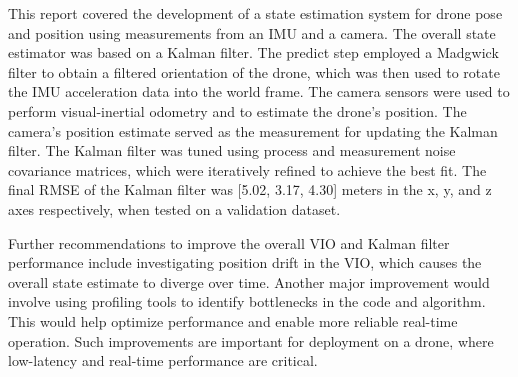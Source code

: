 \documentclass[bare_jrnl_transmag]{subfiles}
\begin{document}
This report covered the development of a state estimation system for drone pose and position using measurements from an IMU and a camera. The overall state estimator was based on a Kalman filter. The predict step employed a Madgwick filter to obtain a filtered orientation of the drone, which was then used to rotate the IMU acceleration data into the world frame. The camera sensors were used to perform visual-inertial odometry and to estimate the drone's position. The camera's position estimate served as the measurement for updating the Kalman filter. The Kalman filter was tuned using process and measurement noise covariance matrices, which were iteratively refined to achieve the best fit. The final RMSE of the Kalman filter was [5.02, 3.17, 4.30] meters in the x, y, and z axes respectively, when tested on a validation dataset. \newline

Further recommendations to improve the overall VIO and Kalman filter performance include investigating position drift in the VIO, which causes the overall state estimate to diverge over time. Another major improvement would involve using profiling tools to identify bottlenecks in the code and algorithm. This would help optimize performance and enable more reliable real-time operation. Such improvements are important for deployment on a drone, where low-latency and real-time performance are critical.
\end{document}
